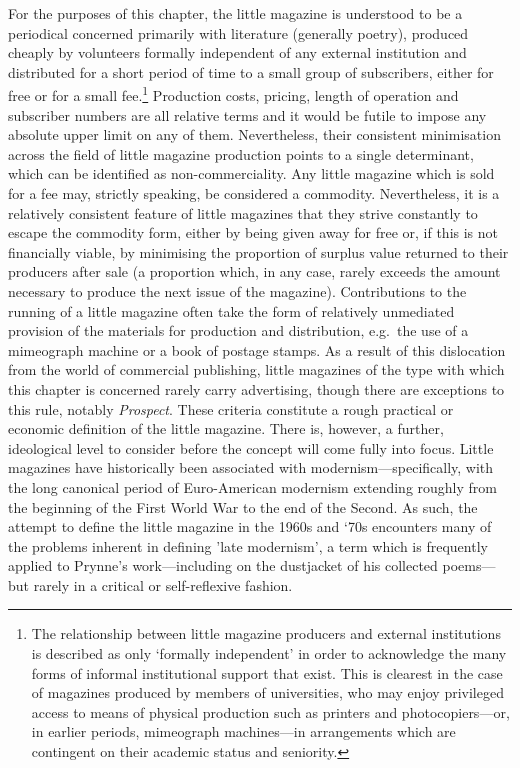\documentclass[]{article}
\begin{document}
For the purposes of this chapter, the little magazine is understood to
be a periodical concerned primarily with literature (generally poetry),
produced cheaply by volunteers formally independent of any external
institution and distributed for a short period of time to a small group
of subscribers, either for free or for a small fee.\footnote{The
  relationship between little magazine producers and external
  institutions is described as only ‘formally independent’ in order to
  acknowledge the many forms of informal institutional support that
  exist. This is clearest in the case of magazines produced by members
  of universities, who may enjoy privileged access to means of physical
  production such as printers and photocopiers—or, in earlier periods,
  mimeograph machines—in arrangements which are contingent on their
  academic status and seniority.} Production costs, pricing, length of
operation and subscriber numbers are all relative terms and it would be
futile to impose any absolute upper limit on any of them. Nevertheless,
their consistent minimisation across the field of little magazine
production points to a single determinant, which can be identified as
non-commerciality. Any little magazine which is sold for a fee may,
strictly speaking, be considered a commodity. Nevertheless, it is a
relatively consistent feature of little magazines that they strive
constantly to escape the commodity form, either by being given away for
free or, if this is not financially viable, by minimising the proportion
of surplus value returned to their producers after sale (a proportion
which, in any case, rarely exceeds the amount necessary to produce the
next issue of the magazine). Contributions to the running of a little
magazine often take the form of relatively unmediated provision of the
materials for production and distribution, e.g.~the use of a mimeograph
machine or a book of postage stamps. As a result of this dislocation
from the world of commercial publishing, little magazines of the type
with which this chapter is concerned rarely carry advertising, though
there are exceptions to this rule, notably \emph{Prospect}. These
criteria constitute a rough practical or economic definition of the
little magazine. There is, however, a further, ideological level to
consider before the concept will come fully into focus. Little magazines
have historically been associated with modernism—specifically, with the
long canonical period of Euro-American modernism extending roughly from
the beginning of the First World War to the end of the Second. As such,
the attempt to define the little magazine in the 1960s and ‘70s
encounters many of the problems inherent in defining ’late modernism’, a
term which is frequently applied to Prynne’s work—including on the
dustjacket of his collected poems—but rarely in a critical or
self-reflexive fashion.
\end{document}
